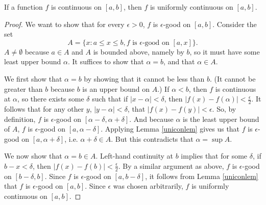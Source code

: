 \begin{theorem}
If a function $f$ is continuous on $[a, b]$, then $f$ is uniformly continuous on $[a, b]$.

\begin{proof}
We want to show that for every $\epsilon > 0$, $f$ is $\epsilon$-good on $[a, b]$. Consider the set
\[ A = \{x: a \le x \le b, f \textrm{ is } \epsilon\textrm{-good on } [a, x]\}. \]
$A \ne \emptyset$ because $a \in A$ and $A$ is bounded above, namely by $b$, so it must have some least upper bound $\alpha$. It suffices to show that $\alpha = b$, and that $\alpha \in A$.

We first show that $\alpha = b$ by showing that it cannot be less than $b$. (It cannot be greater than $b$ because $b$ is an upper bound on $A$.) If $\alpha < b$, then $f$ is continuous at $\alpha$, so there exists some $\delta$ such that if $|x - \alpha| < \delta$, then $|f(x) - f(\alpha)| < \frac \epsilon 2.$ It follows that for any other $y$, $|y - \alpha| < \delta$, that $|f(x) - f(y)| < \epsilon$. So, by definition, $f$ is $\epsilon$-good on $[\alpha - \delta, \alpha + \delta]$. And because $\alpha$ is the least upper bound of $A$, $f$ is $\epsilon$-good on $[a, \alpha - \delta]$. Applying Lemma \ref{uniconlem} gives us that $f$ is $\epsilon$-good on $[a, \alpha + \delta]$, i.e. $\alpha + \delta \in A$. But this contradicts that $\alpha = \sup A$. 

We now show that $\alpha = b \in A$. Left-hand continuity at $b$ implies that for some $\delta$, if $b - x < \delta$, then $|f(x) - f(b)| < \frac \epsilon 2$. By a similar argument as above, $f$ is $\epsilon$-good on $[b - \delta, b]$. Since $f$ is $\epsilon$-good on $[a, b - \delta]$, it follows from Lemma \ref{uniconlem} that $f$ is $\epsilon$-good on $[a, b]$. Since $\epsilon$ was chosen arbitrarily, $f$ is uniformly continuous on $[a, b]$.
\end{proof}
\end{theorem}
